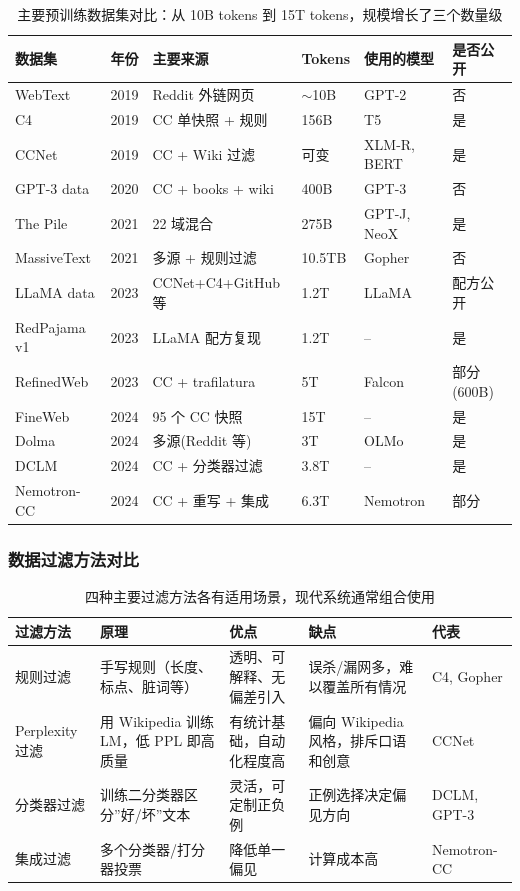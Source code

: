 \documentclass[a4paper]{article}
\begin{document}
\begin{table}[H]
\centering
\small
\begin{tabular}{p{}p{}p{}p{}p{}p{}}
\toprule
\textbf{数据集} & \textbf{年份} & \textbf{主要来源} & \textbf{Tokens} & \textbf{使用的模型} & \textbf{是否公开} \\
\midrule
WebText & 2019 & Reddit 外链网页 & $\sim$10B & GPT-2 & 否 \\
C4 & 2019 & CC 单快照 + 规则 & 156B & T5 & 是 \\
CCNet & 2019 & CC + Wiki 过滤 & 可变 & XLM-R, BERT & 是 \\
GPT-3 data & 2020 & CC + books + wiki & 400B & GPT-3 & 否 \\
The Pile & 2021 & 22 域混合 & 275B & GPT-J, NeoX & 是 \\
MassiveText & 2021 & 多源 + 规则过滤 & 10.5TB & Gopher & 否 \\
LLaMA data & 2023 & CCNet+C4+GitHub 等 & 1.2T & LLaMA & 配方公开 \\
RedPajama v1 & 2023 & LLaMA 配方复现 & 1.2T & -- & 是 \\
RefinedWeb & 2023 & CC + trafilatura & 5T & Falcon & 部分(600B) \\
FineWeb & 2024 & 95 个 CC 快照 & 15T & -- & 是 \\
Dolma & 2024 & 多源(Reddit 等) & 3T & OLMo & 是 \\
DCLM & 2024 & CC + 分类器过滤 & 3.8T & -- & 是 \\
Nemotron-CC & 2024 & CC + 重写 + 集成 & 6.3T & Nemotron & 部分 \\
\bottomrule
\end{tabular}
\caption{主要预训练数据集对比：从 10B tokens 到 15T tokens，规模增长了三个数量级}
\end{table}

\subsubsection{数据过滤方法对比}

\begin{table}[H]
\centering
\begin{tabular}{p{}p{}p{}p{}p{}}
\toprule
\textbf{过滤方法} & \textbf{原理} & \textbf{优点} & \textbf{缺点} & \textbf{代表} \\
\midrule
规则过滤 & 手写规则（长度、标点、脏词等） & 透明、可解释、无偏差引入 & 误杀/漏网多，难以覆盖所有情况 & C4, Gopher \\
Perplexity 过滤 & 用 Wikipedia 训练 LM，低 PPL 即高质量 & 有统计基础，自动化程度高 & 偏向 Wikipedia 风格，排斥口语和创意 & CCNet \\
分类器过滤 & 训练二分类器区分”好/坏”文本 & 灵活，可定制正负例 & 正例选择决定偏见方向 & DCLM, GPT-3 \\
集成过滤 & 多个分类器/打分器投票 & 降低单一偏见 & 计算成本高 & Nemotron-CC \\
\bottomrule
\end{tabular}
\caption{四种主要过滤方法各有适用场景，现代系统通常组合使用}
\end{table}
\end{document}
